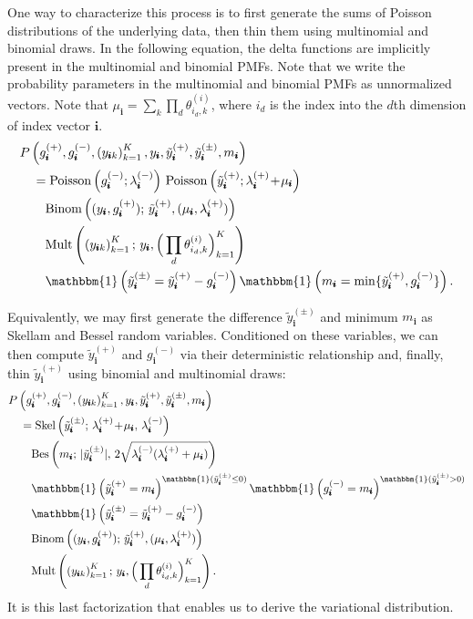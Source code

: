 \documentclass[letterpaper]{article}
\newcommand{\subs}{\pmb{i}}
\newcommand{\wsup}[2]{#1_{\subs}^{(#2)}}
\newcommand{\ytP}{\wsup{\tilde{y}}{+}}
\newcommand{\ytPM}{\wsup{\tilde{y}}{\pm}}
\newcommand{\ysk}{y_{\subs k}}
\newcommand{\ys}{y_{\subs}}
\newcommand{\lamP}{\wsup{\lambda}{+}}
\newcommand{\lamM}{\wsup{\lambda}{-}}
\newcommand{\gP}{\wsup{g}{+}}
\newcommand{\gM}{\wsup{g}{-}}
\newcommand{\ms}{m_{\subs}}
\newcommand{\Pois}[1]{\textup{Poisson}\left( #1 \right)}
\newcommand{\tp}{\!+\!}
\begin{document}
  One way to characterize this process is to first generate the sums of Poisson
  distributions of the underlying data, then thin them
  using multinomial and binomial draws. In the following equation, the delta
  functions are implicitly present in the multinomial and binomial PMFs. Note
  that we write the probability parameters in the multinomial and binomial PMFs
  as unnormalized vectors. Note that $\mu_{\subs} = \sum_k \prod_d
  \theta_{i_d,k}^{(i)}$, where $i_d$ is the index into the $d$th dimension of
  index vector $\subs$.
  \begin{align}
  &P\left(\gP, \gM, \left(\ysk\right)_{k=1}^K, \ys,
    \ytP, \ytPM, \ms\right) \notag \\
  &\quad= \Pois{\gM; \lamM} \,
    \Pois { \ytP; \lamP \tp \mu_{\subs} }
    \notag \\
  &\quad\quad \text{Binom}\left((\ys, \gP);\, \ytP,(\mu_{\subs}, \lamP)\right) \, \notag \\
  &\quad\quad \text{Mult}\left(\left(\ysk\right)_{k=1}^K;\, \ys, \Big( \prod_d \theta_{i_d,k}^{(i)} \Big)_{k=1}^K\right) \notag \\
  &\quad\quad \mathbbm{1}\left(\ytPM =
    \ytP - \gM\right) \mathbbm{1} \left( \ms =
    \min\{\ytP, \gM\} \right) .
  \end{align}

  Equivalently, we may first generate the difference $\ytPM$ and minimum $\ms$ as
  Skellam and Bessel random variables. Conditioned on these variables, we can
  then compute $\ytP$ and $\gM$ via their deterministic relationship and,
  finally, thin $\ytP$ using binomial and multinomial draws:
    \begin{align}
  &P\left(\gP, \gM, \left(\ysk\right)_{k=1}^K, \ys,
    \ytP, \ytPM, \ms\right)\notag\\
    \label{eqn:finalfact}
  &\quad= \text{Skel}\left(\ytPM;\, \lamP \tp \mu_{\subs},\, \lamM\right)\,\notag \\
  &\quad\quad \text{Bes}\left(\ms;\, |\ytPM|,\,2\sqrt{\lamM(\lamP+\mu_{\subs})}\right)\notag\\
  &\quad\quad \mathbbm{1} \left(\ytP=\ms\right)^{\mathbbm{1}(\ytPM \leq 0)} \mathbbm{1} \left(\gM=\ms\right)^{\mathbbm{1}(\ytPM > 0)}\notag \\
  &\quad\quad \mathbbm{1}\left(\ytPM = \ytP - \gM\right)\notag\\
  &\quad\quad \text{Binom}\left((\ys, \gP);\, \ytP, (\mu_{\subs}, \lamP)\right) \,\notag\\
  &\quad\quad \text{Mult}\left(\left(\ysk\right)_{k=1}^K;\, \ys, \Big( \prod_d \theta_{i_d,k}^{(i)} \Big)_{k=1}^K\right).
  \end{align}
  It is this last factorization that enables us to derive the variational
  distribution.
\end{document}
